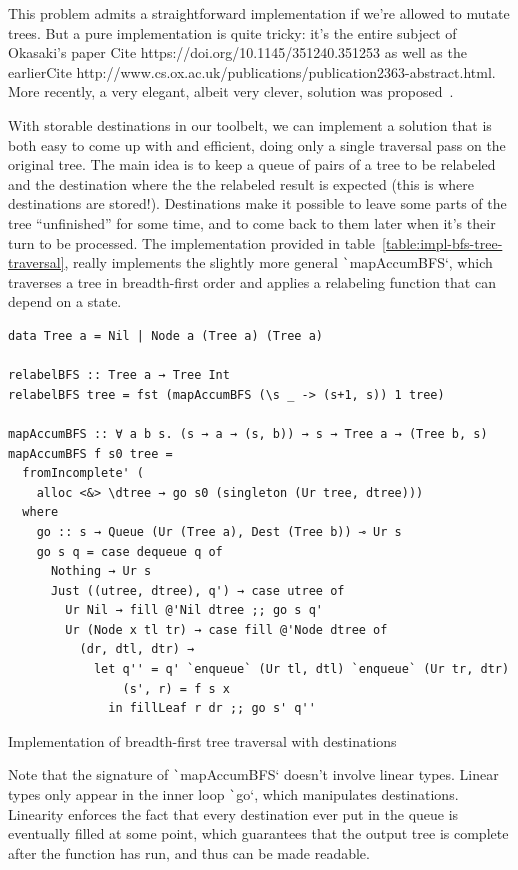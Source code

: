 \documentclass[english]{jflart}
\newcommand{\TODO}[1]{{\color{red}\large #1}}
\begin{document}
This problem admits a straightforward implementation if we're allowed to mutate trees. But a pure implementation is quite tricky: it's the entire subject of Okasaki's paper \TODO{Cite https://doi.org/10.1145/351240.351253} as well as the earlier\TODO{Cite http://www.cs.ox.ac.uk/publications/publication2363-abstract.html}. More recently, a very elegant, albeit very clever, solution was proposed~\cite{gibbons_phases_2023}.

With storable destinations in our toolbelt, we can implement a solution that is both easy to come up with and efficient, doing only a single traversal pass on the original tree. The main idea is to keep a queue of pairs of a tree to be relabeled and the destination where the the relabeled result is expected (this is where destinations are stored!). Destinations make it possible to leave some parts of the tree ``unfinished'' for some time, and to come back to them later when it's their turn to be processed. The implementation provided in table~\ref{table:impl-bfs-tree-traversal}, really implements the slightly more general \texttt`mapAccumBFS`, which traverses a tree in breadth-first order and applies a relabeling function that can depend on a state.

\begin{table}[t]
\small
\begin{verbatim}
data Tree a = Nil | Node a (Tree a) (Tree a)

relabelBFS :: Tree a → Tree Int
relabelBFS tree = fst (mapAccumBFS (\s _ -> (s+1, s)) 1 tree)

mapAccumBFS :: ∀ a b s. (s → a → (s, b)) → s → Tree a → (Tree b, s)
mapAccumBFS f s0 tree =
  fromIncomplete' (
    alloc <&> \dtree → go s0 (singleton (Ur tree, dtree)))
  where
    go :: s → Queue (Ur (Tree a), Dest (Tree b)) ⊸ Ur s
    go s q = case dequeue q of
      Nothing → Ur s
      Just ((utree, dtree), q') → case utree of
        Ur Nil → fill @'Nil dtree ;; go s q'
        Ur (Node x tl tr) → case fill @'Node dtree of
          (dr, dtl, dtr) →
            let q'' = q' `enqueue` (Ur tl, dtl) `enqueue` (Ur tr, dtr)
                (s', r) = f s x
              in fillLeaf r dr ;; go s' q''
\end{verbatim}
\caption{Implementation of breadth-first tree traversal with destinations}
\label{table:impl-bfs-tree-traversal}
\end{table}

Note that the signature of \texttt`mapAccumBFS` doesn't involve linear types. Linear types only appear in the inner loop \texttt`go`, which manipulates destinations. Linearity enforces the fact that every destination ever put in the queue is eventually filled at some point, which guarantees that the output tree is complete after the function has run, and thus can be made readable.
\end{document}
